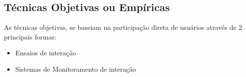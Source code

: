 \subsection{Técnicas Objetivas ou Empíricas}

As técnicas objetivas, se baseiam na participação direta de usuários através de 2 principais formas:

\begin{itemize}
    \item Ensaios de interação
    \item Sistemas de Monitoramento de interação
\end{itemize}






